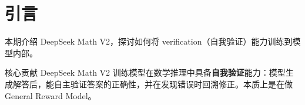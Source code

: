 \section{引言}
本期介绍 DeepSeek Math V2，探讨如何将 verification（自我验证）能力训练到模型内部。

\begin{importantbox}{核心贡献}
DeepSeek Math V2 训练模型在数学推理中具备\textbf{自我验证}能力：模型生成解答后，能自主验证答案的正确性，并在发现错误时回溯修正。本质上是在做 General Reward Model。
\end{importantbox}

